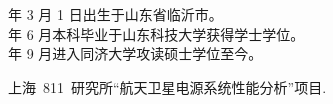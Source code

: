  年 3 月 1 日出生于山东省临沂市。\\
 年 6 月本科毕业于山东科技大学获得学士学位。\\
 年 9 月进入同济大学攻读硕士学位至今。


\begin{enumerate}[{[}1{]}]
\item 上海~811~研究所“航天卫星电源系统性能分析”项目.
\end{enumerate}
